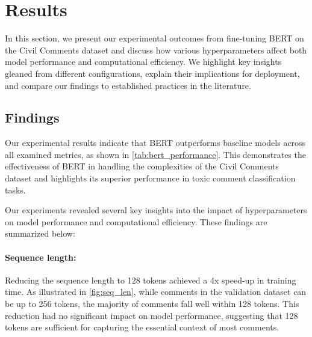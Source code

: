 \section{Results}\label{sec:results}

In this section, we present our experimental outcomes from fine-tuning BERT on the Civil Comments dataset and discuss how various hyperparameters affect both model performance and computational efficiency. We highlight key insights gleaned from different configurations, explain their implications for deployment, and compare our findings to established practices in the literature.

\subsection{Findings}

Our experimental results indicate that BERT outperforms baseline models across all examined metrics, as shown in \cref{tab:bert_performance}. This demonstrates the effectiveness of BERT in handling the complexities of the Civil Comments dataset and highlights its superior performance in toxic comment classification tasks.

\begin{table}[h!]
    \centering
    \caption{BERT performance on the Civil Comments test dataset}
    \label{tab:bert_performance}
\end{table}

\noindent Our experiments revealed several key insights into the impact of hyperparameters on model performance and computational efficiency. These findings are summarized below:

\paragraph{Sequence length:} Reducing the sequence length to 128 tokens achieved a 4x speed-up in training time. As illustrated in \cref{fig:seq_len}, while comments in the validation dataset can be up to 256 tokens, the majority of comments fall well within 128 tokens. This reduction had no significant impact on model performance, suggesting that 128 tokens are sufficient for capturing the essential context of most comments.

